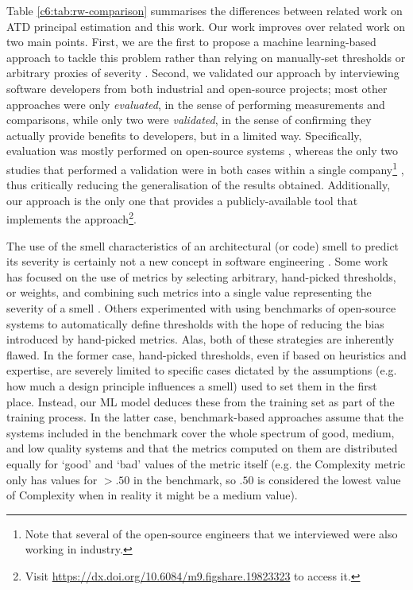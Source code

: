 Table \ref{c6:tab:rw-comparison} summarises the differences between related work on ATD principal estimation and this work. 
Our work improves over related work on two main points.
First, we are the first to propose a machine learning-based approach to tackle this problem rather than relying on manually-set thresholds \cite{Wu2018,Martini2018b} or arbitrary proxies of severity \cite{Roveda2018}.
Second, we validated our approach by interviewing software developers from both industrial and open-source projects; most other approaches were only \emph{evaluated}, in the sense of performing measurements and comparisons, while only two were \emph{validated}, in the sense of confirming they actually provide benefits to developers, but in a limited way.
Specifically, evaluation was mostly performed on open-source systems \cite{Xiao2016,Roveda2018,Verdecchia2020}, whereas the only two studies that performed a validation were in both cases within a single company\footnote{Note that several of the open-source engineers that we interviewed were also working in industry.} \cite{Martini2018b,Wu2018}, thus critically reducing the generalisation of the results obtained. 
Additionally, our approach is the only one that provides a publicly-available tool that implements the approach\footnote{Visit \url{https://dx.doi.org/10.6084/m9.figshare.19823323} to access it.}.

The use of the smell characteristics of an architectural (or code) smell to predict its severity is certainly not a new concept in software engineering \cite{Laval2012,Tsantalis2011,Arcelli2015b,Vidal2016,Roveda2018}.
Some work has focused on the use of metrics by selecting arbitrary, hand-picked thresholds, or weights, and combining such metrics into a single value representing the severity of a smell \cite{Laval2012,Vidal2016}.
Others experimented with using benchmarks of open-source systems to automatically define thresholds \cite{Arcelli2015b} with the hope of reducing the bias introduced by hand-picked metrics. 
Alas, both of these strategies are inherently flawed. In the former case, hand-picked thresholds, even if based on heuristics and expertise, are severely limited to specific cases dictated by the assumptions (e.g. how much a design principle influences a smell) used to set them in the first place.
Instead, our ML model deduces these from the training set as part of the training process.
In the latter case, benchmark-based approaches assume that the systems included in the benchmark cover the whole spectrum of good, medium, and low quality systems and that the metrics computed on them are distributed equally for `good' and `bad' values of the metric itself (e.g. the Complexity metric only has values for $>.50$ in the benchmark, so $.50$ is considered the lowest value of Complexity when in reality it might be a medium value).

